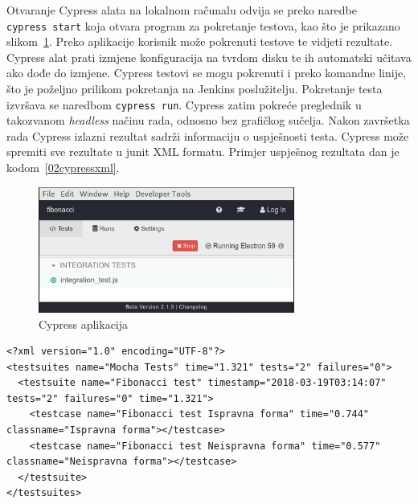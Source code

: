 Otvaranje Cypress alata na lokalnom računalu odvija se preko naredbe \texttt{cypress~start} koja
otvara program za pokretanje testova, kao što je prikazano slikom~\ref{fig:02cypress}. Preko
aplikacije korisnik može pokrenuti testove te vidjeti rezultate. Cypress alat prati izmjene
konfiguracija na tvrdom disku te ih automatski učitava ako dođe do izmjene. Cypress testovi se mogu
pokrenuti i preko komandne linije, što je poželjno prilikom pokretanja na Jenkins poslužitelju.
Pokretanje testa izvršava se naredbom \texttt{cypress~run}. Cypress zatim pokreće preglednik u
takozvanom \textit{headless} načinu rada, odnosno bez grafičkog sučelja. Nakon završetka rada
Cypress izlazni rezultat sadrži informaciju o uspješnosti testa. Cypress može spremiti sve rezultate
u junit XML formatu. Primjer uspješnog rezultata dan je kodom~\ref{02cypressxml}.

\begin{figure}[h]
    \centering
    \includegraphics[width=0.75\textwidth]{img/02/cypress.png}
    \caption{Cypress aplikacija}%
    \label{fig:02cypress}
\end{figure}

\begin{lstlisting}[float=h]
<?xml version="1.0" encoding="UTF-8"?>
<testsuites name="Mocha Tests" time="1.321" tests="2" failures="0">
  <testsuite name="Fibonacci test" timestamp="2018-03-19T03:14:07" tests="2" failures="0" time="1.321">
    <testcase name="Fibonacci test Ispravna forma" time="0.744" classname="Ispravna forma"></testcase>
    <testcase name="Fibonacci test Neispravna forma" time="0.577" classname="Neispravna forma"></testcase>
  </testsuite>
</testsuites>
\end{lstlisting}
